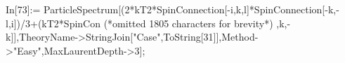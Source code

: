In[73]:= ParticleSpectrum[(2*kT2*SpinConnection[-i,k,l]*SpinConnection[-k,-l,i])/3+(kT2*SpinCon (*omitted 1805 characters for brevity*) ,k,-k]],TheoryName->StringJoin["Case",ToString[31]],Method->"Easy",MaxLaurentDepth->3];
